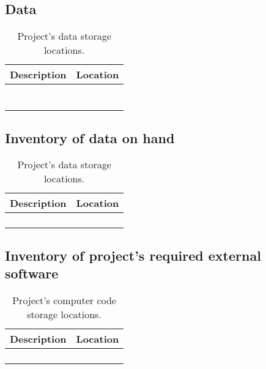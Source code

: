 \documentclass[10pt,letterpaper]{article}
\begin{document}

\subsection*{Data}

\begin{table}
    \centering
    \begin{tabular}{cc}
        Description & Location\\
        \toprule
         & \\
         & \\
         & \\
         & \\
         & \\
         & \\
         & \\
         \bottomrule
    \end{tabular}
    \caption{Project's data storage locations.}
    \label{tab:my_label}
\end{table}

\subsection*{Inventory of data on hand}

\begin{table}
    \centering
    \begin{tabular}{cc}
        Description & Location\\
        \toprule
         & \\
         & \\
         & \\
         & \\
         \bottomrule
    \end{tabular}
    \caption{Project's data storage locations.}
    \label{tab:my_label}
\end{table}


\subsection*{Inventory of project's required external software}

\begin{table}
    \centering
    \begin{tabular}{cc}
        Description & Location\\
        \toprule
         & \\
         & \\
         & \\
         & \\
         \bottomrule
    \end{tabular}
    \caption{Project's computer code storage locations.}
    \label{tab:my_label}
\end{table}
\end{document}
